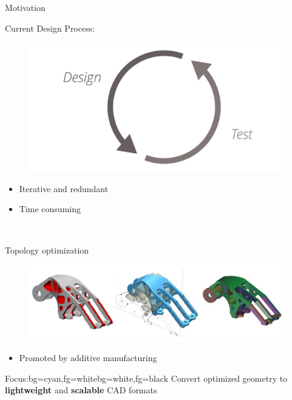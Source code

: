 \begin{frame}{Motivation}
	\begin{multicols}{2}
		Current Design Process:
		\begin{figure}
			\includegraphics[width=0.8\linewidth]{Pictures/Motivation/DesignTest.png}
		\end{figure}
		\begin{itemize}
			\item Iterative and redundant
			\item Time consuming
		\end{itemize}~\\

		\vfill
		\columnbreak
		\pause

		Topology optimization
		\begin{figure}
			\includegraphics[width=0.9\linewidth]{Pictures/Motivation/TopOpt.jpg}
		\end{figure}
		\begin{itemize}
			\item Promoted by additive manufacturing
		\end{itemize}

		\pause
	\end{multicols}
	\begin{variableblock}{Focus:}{bg=cyan,fg=white}{bg=white,fg=black}
	{
	Convert optimized geometry to \textbf{lightweight} and \textbf{scalable} CAD formats
	}
	\end{variableblock}
\end{frame}


